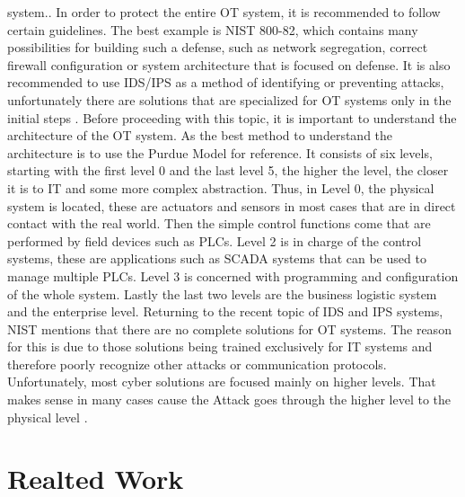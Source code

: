 \documentclass[Master,BMR,english]{twbook}
\begin{document}
system.\cite{poznan_university_of_technology_poznan_poland_industry_2019}.  In order to protect the entire OT system, it is recommended to follow certain guidelines. The best example is NIST 800-82, which contains many possibilities for building such a defense, such as network segregation, correct firewall configuration or system architecture that is focused on defense. It is also recommended to use IDS/IPS as a method of identifying or preventing attacks, unfortunately there are solutions that are specialized for OT systems only in the initial steps \cite{stouffer_guide_2015}. Before proceeding with this topic, it is important to understand the architecture of the OT system. As the best method to understand the architecture is to use the Purdue Model for reference. It consists of six levels, starting with the first level 0 and the last level 5, the higher the level, the closer it is to IT and some more complex abstraction. Thus, in Level 0, the physical system is located, these are actuators and sensors in most cases that are in direct contact with the real world. Then the simple control functions come that are performed by field devices such as PLCs. Level 2 is in charge of the control systems, these are applications such as SCADA systems that can be used to manage multiple PLCs. Level 3 is concerned with programming and configuration of the whole system. Lastly the last two levels are the business logistic system and the enterprise level. Returning to the recent topic of IDS and IPS systems, NIST mentions that there are no complete solutions for OT systems. The reason for this is due to those solutions being trained exclusively for IT systems and therefore poorly recognize other attacks or communication protocols. Unfortunately, most cyber solutions are focused mainly on higher levels. That makes sense in many cases cause the Attack goes through the higher level to the physical level \cite{stouffer_guide_2015}. 

\section{Realted Work}
\end{document}
